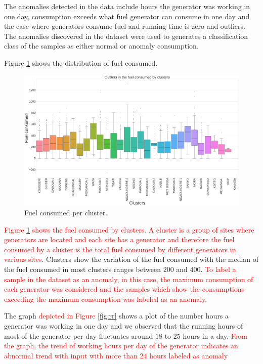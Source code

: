\documentclass[a4paper,fleqn]{cas-dc}
\newcommand\mycorrections[1]{\textcolor{red}{#1}}
\begin{document}
The anomalies detected in the data include hours the generator was working in one day, consumption exceeds what fuel generator can consume in one day and the case where generators consume fuel and running time is zero and outliers. The anomalies discovered in the dataset were used to generates a classification class of the samples as either normal or anomaly consumption. 

Figure 	\ref{fig:boxplot} shows the distribution of fuel consumed.
\begin{figure}
	\begin{minipage}[H]{\linewidth}
	\centering
	\includegraphics[width=1.1\linewidth]{Figures/Boxplot.png}
\end{minipage}
	\caption{Fuel consumed per cluster.}
	\label{fig:boxplot}
\end{figure}
\mycorrections{Figure \ref{fig:boxplot} shows the fuel consumed by clusters. 
	A cluster is a group of sites where generators are located and each site has a generator and therefore the fuel consumed by a cluster is the total fuel consumed by different generators in various sites}. Clusters show the variation of the fuel consumed with the median of the fuel consumed in most clusters ranges between $200$ and $400$. \mycorrections {To label a sample in the dataset as an anomaly, in this case,  the maximum consumption of each generator was considered and the samples which show the consumptions exceeding the maximum consumption was labeled as an anomaly}. 

The graph \mycorrections { depicted in Figure \ref{fig:rr}} shows a plot of the number hours a generator was working in one day and we observed that the running hours of most of the generator per day fluctuates around $18$ to $25$ hours in a day. \mycorrections{ From the graph, the trend of working hours per day of the generator indicates an abnormal trend with input with more than 24 hours labeled as anomaly}
\end{document}
